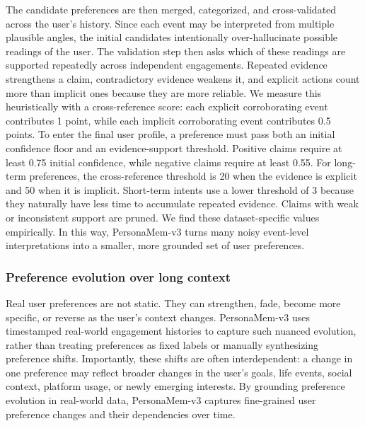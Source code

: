 \documentclass[]{fairmeta}
\begin{document}
The candidate preferences are then merged, categorized, and cross-validated across the user’s history. Since each event may be interpreted from multiple plausible angles, the initial candidates intentionally over-hallucinate possible readings of the user. The validation step then asks which of these readings are supported repeatedly across independent engagements. Repeated evidence strengthens a claim, contradictory evidence weakens it, and explicit actions count more than implicit ones because they are more reliable. We measure this heuristically with a cross-reference score: each explicit corroborating event contributes 1 point, while each implicit corroborating event contributes 0.5 points. To enter the final user profile, a preference must pass both an initial confidence floor and an evidence-support threshold. Positive claims require at least 0.75 initial confidence, while negative claims require at least 0.55. For long-term preferences, the cross-reference threshold is 20 when the evidence is explicit and 50 when it is implicit. Short-term intents use a lower threshold of 3 because they naturally have less time to accumulate repeated evidence. Claims with weak or inconsistent support are pruned. We find these dataset-specific values empirically. In this way, PersonaMem-v3 turns many noisy event-level interpretations into a smaller, more grounded set of user preferences.

\subsubsection{Preference evolution over long context}
\label{subsubsec:contradictions_horizons}

Real user preferences are not static. They can strengthen, fade, become more specific, or reverse as the user’s context changes. PersonaMem-v3 uses timestamped real-world engagement histories to capture such nuanced evolution, rather than treating preferences as fixed labels or manually synthesizing preference shifts. Importantly, these shifts are often interdependent: a change in one preference may reflect broader changes in the user’s goals, life events, social context, platform usage, or newly emerging interests. By grounding preference evolution in real-world data, PersonaMem-v3 captures fine-grained user preference changes and their dependencies over time.
\end{document}

